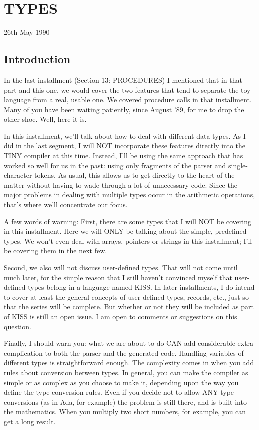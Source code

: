 
\chapter{TYPES}

26th May 1990

\section{Introduction}

In the  last installment (Section 13: PROCEDURES) I mentioned that in that part and this one, we  would cover the two features that tend  to  separate  the toy language from a real, usable one. We covered  procedure  calls  in that installment. Many of you have been  waiting patiently, since August '89, for  me  to  drop  the other shoe. Well, here it is.

In this installment, we'll talk  about how to deal with different data types. As I did in the last segment, I will NOT incorporate these  features directly into the TINY  compiler  at  this  time. Instead, I'll be using the same approach that has worked  so well for  us  in the past: using only  fragments  of  the  parser  and single-character  tokens. As  usual, this  allows  us to  get directly to the  heart  of  the  matter  without  having  to wade through a lot of  unnecessary  code. Since the major problems in dealing with multiple types occur in  the  arithmetic operations, that's where we'll concentrate our focus.

A  few words of warning:  First, there are some types that I will NOT  be  covering in this installment. Here  we  will  ONLY  be talking about the simple, predefined types. We  won't  even deal with arrays, pointers or strings  in  this  installment;  I'll be covering them in the next few.

Second, we also will not discuss user-defined types. That will not come until  much  later, for  the simple reason that I still haven't convinced myself  that  user-defined  types  belong  in a language named KISS. In later installments, I do intend to cover at least the general  concepts  of  user-defined  types, records, etc., just so that the series  will  be complete. But whether or not they will be included as part of KISS is still an open issue. I am open to comments or suggestions on this question.

Finally, I  should  warn you: what we are about to  do  CAN  add considerable  extra  complication  to  both  the  parser  and the generated  code. Handling  variables  of  different  types  is straightforward enough. The complexity  comes  in  when  you add rules about conversion between types. In general, you  can make the  compiler  as  simple or as complex as you choose to make it, depending upon the  way  you  define  the  type-conversion rules. Even if you decide not to allow ANY type conversions (as  in Ada, for example) the problem is still there, and is  built  into  the mathematics. When  you  multiply two short numbers, for example, you can get a long result.


